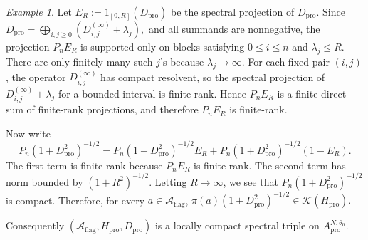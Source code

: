 \documentclass[11pt]{amsart}
\theoremstyle{definition}
\theoremstyle{remark}
\newtheorem{example}[theorem]{Example}
\newcommand{\ex}{\mathrm{pro}}
\begin{document}
\begin{example}
Let $E_R:=1_{[0,R]}(D_{\ex})$
be the spectral projection of $D_{\ex}$. Since $D_{\ex}=\bigoplus_{i,j\geq0}
\left(D_{i,j}^{(\infty)}+\lambda_j\right),$
and all summands are nonnegative, the projection $P_nE_R$ is supported only
on blocks satisfying $0\leq i\leq n$ and $\lambda_j\leq R.$
There are only finitely many such $j$'s because $\lambda_j\to\infty$. For
each fixed pair $(i,j)$, the operator $D_{i,j}^{(\infty)}$ has compact
resolvent, so the spectral projection of $D_{i,j}^{(\infty)}+\lambda_j$
for a bounded interval is finite-rank. Hence $P_nE_R$ is a finite direct sum
of finite-rank projections, and therefore $P_nE_R$ is finite-rank.

Now write
\[
P_n(1+D_{\ex}^2)^{-1/2}
=
P_n(1+D_{\ex}^2)^{-1/2}E_R+
P_n(1+D_{\ex}^2)^{-1/2}(1-E_R).
\]
The first term is finite-rank because $P_nE_R$ is finite-rank. The second term
has norm bounded by $(1+R^2)^{-1/2}.$
Letting $R\to\infty$, we see that $P_n(1+D_{\ex}^2)^{-1/2}$
is compact. Therefore, for every $a\in\mathcal A_{\mathrm{flag}}$, $\pi(a)(1+D_{\ex}^2)^{-1/2}\in\mathcal K(H_{\ex}).$

Consequently $(\mathcal A_{\mathrm{flag}},H_{\ex},D_{\ex})$
is a locally compact spectral triple on $A_{\ex}^{N,\theta_0}$.


\end{example}


\end{document}
